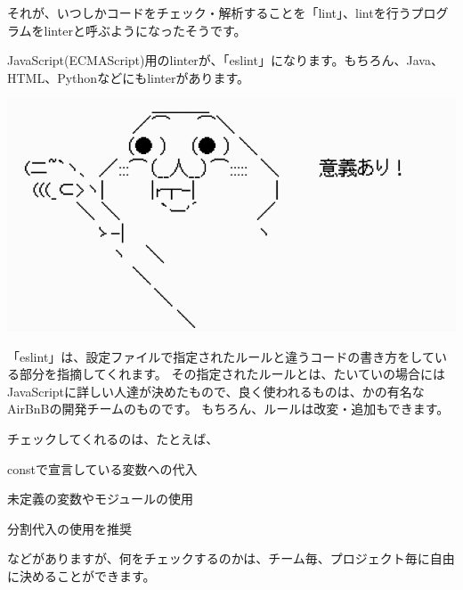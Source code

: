 \vspace*{\baselineskip}

それが、いつしかコードをチェック・解析することを「lint」、lintを行うプログラムをlinterと呼ぶようになったそうです。

\vspace*{\baselineskip}

JavaScript(ECMAScript)用のlinterが、「eslint」になります。もちろん、Java、HTML、Pythonなどにもlinterがあります。

\begin{reviewimage}[H]%
\includegraphics[width=0.7\maxwidth]{./images/02-create-react-app/linter.png}%
\label{image:02-create-react-app:linter}
\end{reviewimage}
\vspace*{\baselineskip}

「eslint」は、設定ファイルで指定されたルールと違うコードの書き方をしている部分を指摘してくれます。
その指定されたルールとは、たいていの場合にはJavaScriptに詳しい人達が決めたもので、良く使われるものは、かの有名なAirBnBの開発チームのものです。
もちろん、ルールは改変・追加もできます。

\vspace*{\baselineskip}

チェックしてくれるのは、たとえば、

\begin{starteritemize}
\item constで宣言している変数への代入
\item 未定義の変数やモジュールの使用
\item 分割代入の使用を推奨
\end{starteritemize}

などがありますが、何をチェックするのかは、チーム毎、プロジェクト毎に自由に決めることができます。

\vspace*{\baselineskip}

